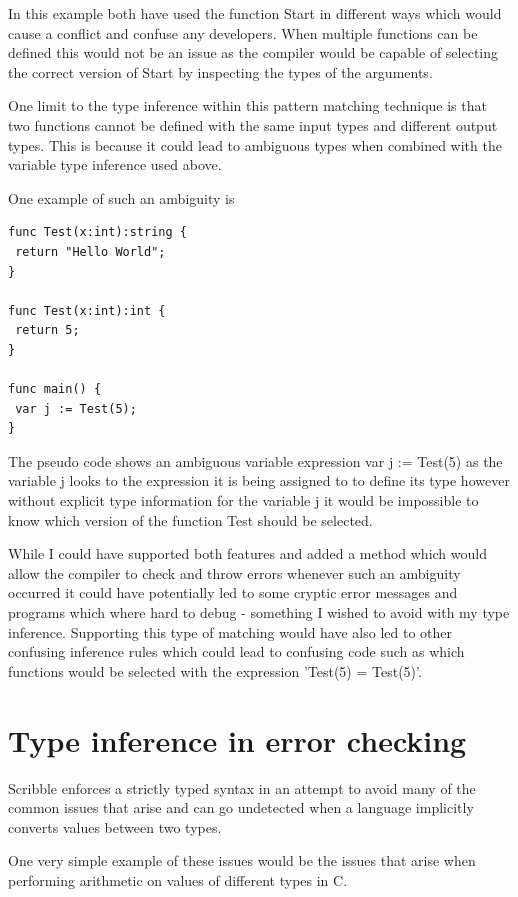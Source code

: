\documentclass[]{final_report}
\begin{document}
In this example both have used the function Start in different ways which would cause a conflict and confuse any developers. When multiple functions can be defined this would not be an issue as the compiler would be capable of selecting the correct version of Start by inspecting the types of the arguments.

One limit to the type inference within this pattern matching technique is that two functions cannot be defined with the same input types and different output types. This is because it could lead to ambiguous types when combined with the variable type inference used above.

One example of such an ambiguity is
\begin{verbatim}
func Test(x:int):string {
 return "Hello World";
}

func Test(x:int):int {
 return 5; 
}

func main() { 
 var j := Test(5);
}
\end{verbatim}

The pseudo code shows an ambiguous variable expression var j := Test(5) as the variable j looks to the expression it is being assigned to to define its type however without explicit type information for the variable j it would be impossible to know which version of the function Test should be selected.

While I could have supported both features and added a method which would allow the compiler to check and throw errors whenever such an ambiguity occurred it could have potentially led to some cryptic error messages and programs which where hard to debug - something I wished to avoid with my type inference. Supporting this type of matching would have also led to other confusing inference rules which could lead to confusing code such as which functions would be selected with the expression 'Test(5) = Test(5)'.

\section{Type inference in error checking}

Scribble enforces a strictly typed syntax in an attempt to avoid many of the common issues that arise and can go undetected when a language implicitly converts values between two types.

One very simple example of these issues would be the issues that arise when performing arithmetic on values of different types in C.
\end{document}
